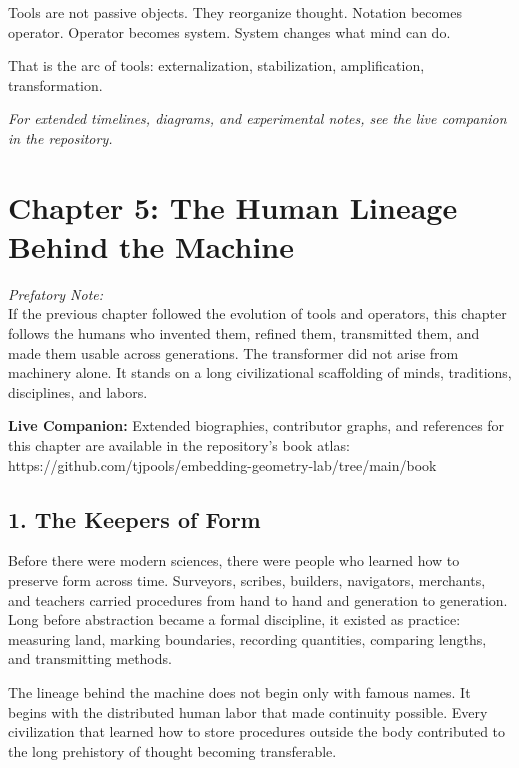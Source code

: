 Tools are not passive objects. They reorganize thought. Notation becomes
operator. Operator becomes system. System changes what mind can do.

That is the arc of tools: externalization, stabilization, amplification,
transformation.

\emph{For extended timelines, diagrams, and experimental notes, see the
live companion in the repository.}

\newpage
\vspace*{3cm}

\hypertarget{chapter-5-the-human-lineage-behind-the-machine}{%
\section{Chapter 5: The Human Lineage Behind the
Machine}\label{chapter-5-the-human-lineage-behind-the-machine}}

\emph{Prefatory Note:}\\
If the previous chapter followed the evolution of tools and operators,
this chapter follows the humans who invented them, refined them,
transmitted them, and made them usable across generations. The
transformer did not arise from machinery alone. It stands on a long
civilizational scaffolding of minds, traditions, disciplines, and
labors.

\textbf{Live Companion:} Extended biographies, contributor graphs, and
references for this chapter are available in the repository's book
atlas:\\
https://github.com/tjpools/embedding-geometry-lab/tree/main/book

\hypertarget{the-keepers-of-form}{%
\subsection{1. The Keepers of Form}\label{the-keepers-of-form}}

Before there were modern sciences, there were people who learned how to
preserve form across time. Surveyors, scribes, builders, navigators,
merchants, and teachers carried procedures from hand to hand and
generation to generation. Long before abstraction became a formal
discipline, it existed as practice: measuring land, marking boundaries,
recording quantities, comparing lengths, and transmitting methods.

The lineage behind the machine does not begin only with famous names. It
begins with the distributed human labor that made continuity possible.
Every civilization that learned how to store procedures outside the body
contributed to the long prehistory of thought becoming transferable.

